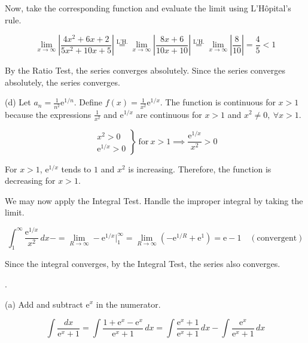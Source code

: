 \documentclass{article}
\begin{document}
\hfill

\noindent Now, take the corresponding function and evaluate the limit using L'Hôpital's rule.

\[\lim_{x\to\infty}\left|\frac{4x^2+6x+2}{5x^2+10x+5}\right|\overset{\text{L'H.}}{=}\lim_{x\to\infty}\left|\frac{8x+6}{10x+10}\right|\overset{\text{L'H.}}{=}\lim_{x\to\infty}\left|\frac{8}{10}\right|=\frac45<1\]

\hfill

\noindent By the Ratio Test, the series converges absolutely. Since the series converges absolutely, the series converges.

\hfill

\noindent (d) Let $\displaystyle a_n=\frac1{n^2}\mathrm{e}^{1/n}$. Define $\displaystyle f(x)=\frac1{x^2}\mathrm{e}^{1/x}$. The function is continuous for $x>1$ because the expressions $\displaystyle\frac1{x^2}$ and $\mathrm{e}^{1/x}$ are continuous for $x>1$ and $x^2\neq0,\:\forall x>1$.

\[\left.\begin{array}{c}
x^2>0\\
\mathrm{e}^{1/x}>0
\end{array}\right\}\:\text{for}\:x>1\implies\frac{\mathrm{e}^{1/x}}{x^2}>0\]

\hfill

\noindent For $x>1$, $\mathrm{e}^{1/x}$ tends to $1$ and $x^2$ is increasing. Therefore, the function is decreasing for $x>1$.

\hfill

\noindent We may now apply the Integral Test. Handle the improper integral by taking the limit.

\[\int_1^\infty\frac{\mathrm{e}^{1/x}}{x^2}\,dx-=\lim_{R\to\infty}-\mathrm{e}^{1/x}\bigg|_1^\infty=\lim_{R\to\infty}\left(-\mathrm{e}^{1/R}+\mathrm{e}^{1}\right)=\mathrm{e}-1\quad(\text{convergent})\]

\hfill

\noindent Since the integral converges, by the Integral Test, the series also converges.

\newpage

.

\hfill

\noindent (a) Add and subtract $\mathrm{e}^x$ in the numerator.

\[\int\frac{dx}{\mathrm{e}^x+1}=\int\frac{1+\mathrm{e}^x-\mathrm{e}^x}{\mathrm{e}^x+1}\,dx=\int\frac{\mathrm{e}^x+1}{\mathrm{e}^x+1}\,dx-\int\frac{\mathrm{e}^x}{\mathrm{e}^x+1}\,dx\]
\end{document}
